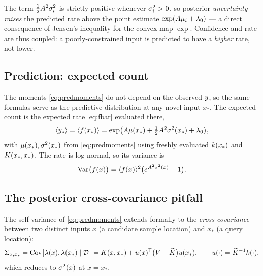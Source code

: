 \begin{remark}
The term $\tfrac12A^2\sigma^{2}_i$ is strictly positive whenever $\sigma^{2}_i>0$, so
posterior \emph{uncertainty raises} the predicted rate above the point estimate
$\exp(A\mu_i+\lambda_{0})$ --- a direct consequence of Jensen's inequality for
the convex map $\exp$. Confidence and rate are thus coupled: a poorly-constrained
input is predicted to have a \emph{higher} rate, not lower.
\end{remark}

\subsection{Prediction: expected count}\label{sec:prediction}

The moments \eqref{eq:predmoments} do not depend on the observed $y$, so the
same formulas serve as the predictive distribution at any novel input $x_\ast$.
The expected count is the expected rate \eqref{eq:fbar} evaluated there,
\begin{equation}
  \langle y_\ast\rangle=\langle f(x_\ast)\rangle
    =\exp\!\big(A\mu(x_\ast)+\tfrac12A^2\sigma^{2}(x_\ast)+\lambda_{0}\big),
\end{equation}
with $\mu(x_\ast),\sigma^{2}(x_\ast)$ from \eqref{eq:predmoments} using freshly
evaluated $k(x_\ast)$ and $K(x_\ast,x_\ast)$. The rate is
log-normal, so its variance is
\begin{equation}
  \operatorname{Var}\!\big(f(x)\big)
    =\langle f(x)\rangle^2\big(e^{A^2\sigma^{2}(x)}-1\big).
  \label{eq:fvar}
\end{equation}

\subsection{The posterior cross-covariance pitfall}\label{sec:crosscov}

The self-variance of \eqref{eq:predmoments} extends formally to the
\emph{cross-covariance} between two distinct inputs $x$ (a candidate sample
location) and $x_\ast$ (a query location):
\begin{equation}
  \Sigma_{x,x_\ast}=\operatorname{Cov}\!\big[\lambda(x),\lambda(x_\ast)\mid \mathcal D\big]
    =K(x,x_\ast)+u(x)^{\mathsf{T}}\big(V-\widetilde{K}\big)u(x_\ast),
  \qquad u(\cdot)=\widetilde{K}^{-1}k(\cdot),
  \label{eq:crosscov}
\end{equation}
which reduces to $\sigma^{2}(x)$ at $x=x_\ast$.

